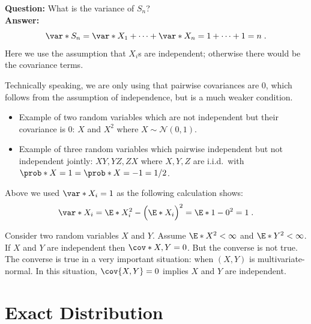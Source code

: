 \medskip

\noindent\textbf{Question:} What is the variance of $S_n$?\\
\textbf{Answer:}
\begin{equation}
\var*{S_n}=\var*{X_1}+\cdots+\var*{X_n}=1+\cdots+1=n\;.
\end{equation}
Here we use the assumption that $X_i$s are independent; otherwise there would be the covariance terms. 

\begin{tcolorbox}[title={Skip on first reading}]
Technically speaking, we are only using that pairwise covariances are $0$, which follows from the assumption of independence, but is a much weaker condition. 
\tcblower
\begin{itemize}
    \item Example of two random variables which are not independent but their covariance is $0$: $X$ and $X^2$ where $X\sim\mathcal{N}(0,1)$.
    \item Example of three random variables which pairwise independent but not independent jointly: $XY,YZ,ZX$ where
    $X,Y,Z$ are i.i.d.\ with $\prob*{X=1}=\prob*{X=-1}=1/2$. 
\end{itemize}
\end{tcolorbox}

Above we used $\var*{X_i}=1$ as the following calculation shows:
\begin{equation}
\var*{X_i}=\E*{X_i^2}-\Bigl(\E*{X_i}\Bigr)^2=\E*{1}-0^2=1\;.
\end{equation}

\begin{tcolorbox}[title={Skip on first reading}]
Consider two random variables 
$X$ and $Y$. Assume $\E*{X^2}<\infty$
and $\E*{Y^2}<\infty$.
\tcblower
If $X$ and $Y$ are independent then 
$\cov*{X,Y}=0$. But the converse is
not true. The converse is true in a
very important situation: when $(X,Y)$
is multivariate-normal. In this situation,
$\cov{X,Y}=0$ implies $X$ and $Y$ are independent. 
\end{tcolorbox}

\section{Exact Distribution}

